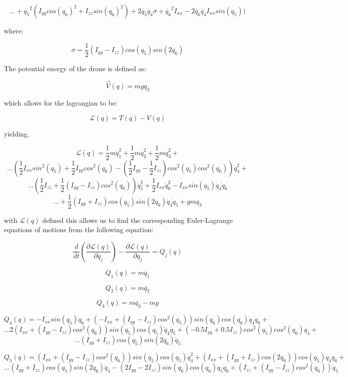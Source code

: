 \documentclass[10pt, letterpaper]{article}
\begin{document}
\[
\ldots+\dot{q_{5}}^{2}(I_{yy}cos(q_{6})^{2}+I_{zz}sin(q_{6})^{2})+2\dot{q_{5}}\dot{q_{4}}\sigma+\dot{q_{6}}^{2}I_{xx}-2\dot{q_{6}}\dot{q_{4}}I_{xx}sin(q_{5}))
\]

where:

\[
\sigma=\frac{1}{2}(I_{yy}-I_{zz}){cos}(q_{5}){sin}(2q_{6})
\]

The potential energy of the drone is defined as:

\[
\overrightarrow{V}(q)=mgq_{3}
\]

which allows for the lagrangian to be:

\[
\mathcal{L}(q)=T(q)-V(q)
\]

yielding,

\[
\mathcal{L}(q) = \frac{1}{2} m \dot{q}_{1}^{2} + \frac{1}{2} m \dot{q}_{2}^{2} + \frac{1}{2} m \dot{q}_{3}^{2} + 
\]
\[
\ldots(\frac{1}{2} I_{xx} {sin}^{2}(q_{5}) + \frac{1}{2} I_{yy} {cos}^{2}(q_{6}) - (\frac{1}{2} I_{yy} - \frac{1}{2} I_{zz}) {cos}^{2}(q_{5}) {cos}^{2}(q_{6})) \dot{q}_{4}^{2} + 
\]
\[
\dots(\frac{1}{2} I_{zz} + \frac{1}{2} (I_{yy} - I_{zz}) {cos}^{2}(q_{6})) \dot{q}_{5}^{2} + \frac{1}{2} I_{xx} \dot{q}_{6}^{2} - I_{xx} {sin}(q_{5}) \dot{q}_{4} \dot{q}_{6} 
\]
\[
\ldots+ \frac{1}{2}(I_{yy} + I_{zz}) {cos}(q_{5}){sin}(2q_{6}) \dot{q}_{4} \dot{q}_{5}+ g m q_{3}
\]

with $\mathcal{L}(q)$ defined this allows us to find the corresponding
Euler-Lagrange equations of motions from the following equation:

\[
\frac{d}{dt}(\frac{\partial\mathcal{L}(q)}{\partial\dot{q_{j}}})-\frac{\partial\mathcal{L}(q)}{\partial q_{j}}=Q_{j}(q)
\]

\[
Q_{1}(q)=m\ddot{q_{1}}
\]

\[
Q_{2}(q)=m\ddot{q_{2}}
\]

\[
Q_{3}(q)=m\ddot{q_{3}}-mg
\]

\[
Q_{4}(q) = - I_{xx} {sin}(q_{5}) \ddot{q}_{6} + (- I_{xx} + (I_{yy} - I_{zz}) {cos}^{2}(q_{5})) {sin}(q_{6}) {cos}(q_{6}) \dot{q}_{4} \dot{q}_{6} + 
\]
\[
\ldots2 (I_{xx} + (I_{yy} - I_{zz}) {cos}^{2}(q_{6})) {sin}(q_{5}) {cos}(q_{5}) \dot{q}_{4} \dot{q}_{5} + (- 0.5 I_{yy} + 0.5 I_{zz}) {cos}^{2}(q_{5}) {cos}^{2}(q_{6}) \ddot{q}_{4} +
\]
\[ 
\ldots(I_{yy} + I_{zz}) {cos}(q_{5}) {sin}(2q_{6}) \ddot{q}_{5}
\]

\[
Q_{5}(q) =(I_{xx} + (I_{yy} - I_{zz}) {cos}^{2}(q_{6})) {sin}(q_{5}) {cos}(q_{5}) \dot{q}_{4}^{2} + (I_{xx} + (I_{yy} + I_{zz}) {cos}(2 q_{6})) {cos}(q_{5}) \dot{q}_{4} \dot{q}_{6} + 
\]
\[
\ldots(I_{yy} + I_{zz}) {cos}(q_{5}) {sin}(2q_{6}) \ddot{q}_{4} - (2 I_{yy} - 2 I_{zz}) {sin}(q_{6}) {cos}(q_{6}) \dot{q}_{5} \dot{q}_{6} + (I_{zz} + (I_{yy} - I_{zz}) {cos}^{2}(q_{6})) \ddot{q}_{5}
\]
\end{document}
